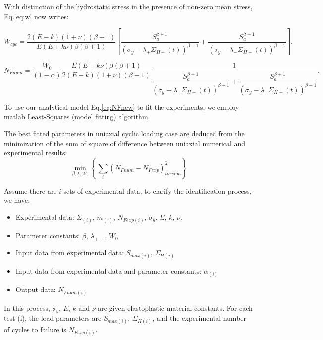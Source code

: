 With distinction of the hydrostatic stress in the presence of non-zero mean stress, Eq.\eqref{eq:w} now writes:

\begin{equation}
W_{cyc}=\dfrac{2(E-k)(1+\nu)\left( \beta-1\right) }{ E(E+k\nu)\beta\left( \beta+1\right) }\left[ \dfrac{S_{a}^{\beta+1}}{ \left(\sigma_y-\lambda_+ \overline{\Sigma}_{H+}(t)\right)^{\beta-1}}+\dfrac{S_{a}^{\beta+1}}{ \left(\sigma_y-\lambda_- \overline{\Sigma}_{H-}(t)\right)^{\beta-1}}\right] .
\label{eq:wcycnew}
\end{equation}

\begin{equation}N_{Fnum}=\dfrac{W_0}{\left( 1-\alpha\right) }\dfrac{E(E+k\nu)\beta\left( \beta+1\right) }{ 2(E-k)(1+\nu)\left( \beta-1\right) }\dfrac{1}{\dfrac{S_{a}^{\beta+1}}{\left(\sigma_y-\lambda_+\overline{\Sigma}_{H+}(t)\right)^{\beta-1}}+\dfrac{S_{a}^{\beta+1}}{\left(\sigma_y-\lambda_-\overline{\Sigma}_{H-}(t)\right)^{\beta-1}}}.\label{eq:NFnew}
\end{equation}


To use our analytical model Eq.\eqref{eq:NFnew} to fit the experiments, we employ matlab Least-Squares (model fitting) algorithm. 

The best fitted parameters in uniaxial cyclic loading case are deduced from the minimization of the sum of square of difference between uniaxial numerical and experimental results:
\begin{equation}
\min_{\beta,\lambda,W_0}\left\lbrace \sum_{i}\left(N_{Fnum}-N_{Fexp} \right)_{torsion}^2\right\rbrace 
\label{eq.leastsquares}
\end{equation}

Assume there are $i$ sets of experimental data, to clarify the identification process, we have:
\begin{itemize}
	\item Experimental data: $\Sigma_{(i)}$, $m_{(i)}$, $N_{Fexp(i)}$, $\sigma_y$, $E$, $k$, $\nu$.
	\item Parameter constants: $\beta$, $\lambda_{+-}$, $W_0$
	\item Input data from experimental data: $S_{max(i)}$, $\Sigma_{H(i)}$
	\item Input data from experimental data and parameter constants: $\alpha_{(i)}$
	\item Output data: $N_{Fnum(i)}$
\end{itemize}

In this process, $\sigma_y$, $E$, $k$ and $\nu$ are given elastoplastic material constants. For each test (i), the load parameters are $S_{max(i)}$, $\Sigma_{H(i)}$, and the experimental number of cycles to failure is $N_{Fexp(i)}$.

